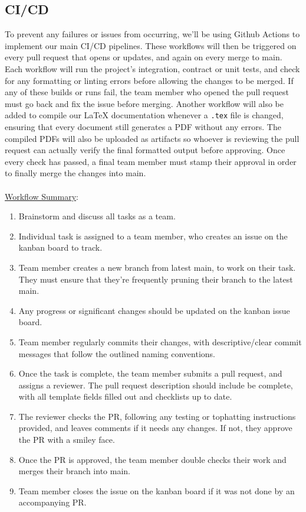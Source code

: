 \documentclass{article}
\begin{document}
\subsection*{CI/CD}
To prevent any failures or issues from occurring, we'll be using Github Actions to implement
our main CI/CD pipelines. These workflows will then be triggered on every pull request
that opens or updates, and again on every merge to main. Each workflow will run 
the project's integration, contract or unit tests, and check for any formatting or
linting errors before allowing the changes to be merged. If any of these builds or runs
fail, the team member who opened the pull request must go back and fix the issue before 
merging. Another workflow will also be added to compile our LaTeX documentation whenever a
\texttt{.tex} file is changed, ensuring that every document still generates a PDF without
any errors. The compiled PDFs will also be uploaded as artifacts so whoever is reviewing
the pull request can actually verify the final formatted output before approving.
Once every check has passed, a final team member must stamp their approval in order to
finally merge the changes into main.
\\\\
\underline{Workflow Summary}:
\begin{enumerate}
    \item Brainstorm and discuss all tasks as a team.
    \item Individual task is assigned to a team member, who creates an issue on the kanban board to track.
    \item Team member creates a new branch from latest main, to work on their task. They must ensure that they're frequently pruning their branch to the latest main.
    \item Any progress or significant changes should be updated on the kanban issue board.
    \item Team member regularly commits their changes, with descriptive/clear commit messages that follow the outlined naming conventions.
    \item Once the task is complete, the team member submits a pull request, and assigns a reviewer. The pull request description should include be complete, with all template fields filled out and checklists up to date.
    \item The reviewer checks the PR, following any testing or tophatting instructions provided, and leaves comments if it needs any changes. If not, they approve the PR with a smiley face.
    \item Once the PR is approved, the team member double checks their work and merges their branch into main.
    \item Team member closes the issue on the kanban board if it was not done by an accompanying PR.
\end{enumerate}
\end{document}
